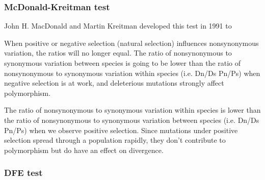 \subsubsection{McDonald-Kreitman test}
John H. MacDonald and Martin Kreitman developed this test in 1991 to 


When positive or negative selection (natural selection) influences nonsynonymous variation, the ratios will no longer equal. 
The ratio of nonsynonymous to synonymous variation between species is going to be lower than the ratio of nonsynonymous to synonymous variation within species (i.e. Dn/Ds  Pn/Ps) when negative selection is at work, and deleterious mutations strongly affect polymorphism.

The ratio of nonsynonymous to synonymous variation within species is lower than the ratio of nonsynonymous to synonymous variation between species (i.e. Dn/Ds Pn/Ps) when we observe positive selection. 
Since mutations under positive selection spread through a population rapidly, they don't contribute to polymorphism but do have an effect on divergence.


\subsubsection{DFE test}


